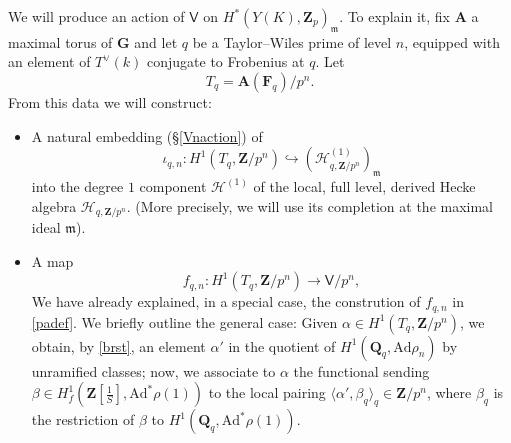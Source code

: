 \documentclass[10pt]{amsart}
\newcommand{\Z}{\mathbf{Z}}
\newcommand{\Ad}{\mathrm{Ad}}
\newcommand{\Q}{\mathbf{Q}}
\newcommand{\ramprimes}{S}
\theoremstyle{remark}
\newcommand{\F}{\mathbf{F}}
\begin{document}
We will produce an action of $\mathsf{V}$ on   $H^*(Y(K), \Z_p)_{\mathfrak{m}}$.
To explain it, fix $\mathbf{A}$   a maximal torus of $\mathbf{G}$ and
let $q$ be a Taylor--Wiles prime of level $n$, 
equipped with an element of $T^{\vee}(k)$ conjugate to  Frobenius at $q$. 
Let $$T_q = \mathbf{A}(\F_q)/p^n.$$   
From this data we  will construct:  
\begin{itemize}
\item[-] 
A natural embedding (\S \ref{Vnaction})  of  
 \begin{equation} \label{iotaqndef1} \iota_{q,n}: H^1(T_q,\Z/p^n) \hookrightarrow \left( \mathscr{H}^{(1)}_{q,\Z/p^n}\right)_{\mathfrak{m}} \end{equation} into the  degree $1$ component $ \mathscr{H}^{(1)}$ of the  local, full level,  derived Hecke algebra
$\mathscr{H}_{q, \Z/p^n}  $. (More precisely, we will use its completion at the maximal ideal $\mathfrak{m}$).   
\item[-]  A map \begin{equation} \label{fqndef} f_{q,n}: H^1(T_q, \Z/p^n) \rightarrow \mathsf{V}/p^n, \end{equation} 
We have already explained, in a special case, the constrution of $f_{q,n}$ in \eqref{padef}.
We briefly outline the general case: 
Given $\alpha \in H^1(T_q, \Z/p^n)$,
we obtain, by \eqref{brst}, an element  $\alpha'$ in the quotient of $H^1(\Q_q, \Ad \rho_n)$
by unramified classes;  now,  we associate to $\alpha$
the functional  sending $\beta \in H^1_f(\Z[\frac{1}{\ramprimes}], \Ad^* \rho(1))$ 
to the local pairing $\langle \alpha' , \beta_q \rangle_q  \in \Z/p^n$, where $\beta_q$ is the restriction of $\beta$ to $H^1(\Q_q, \Ad^* \rho(1))$. 
\end{itemize} 
\end{document}
